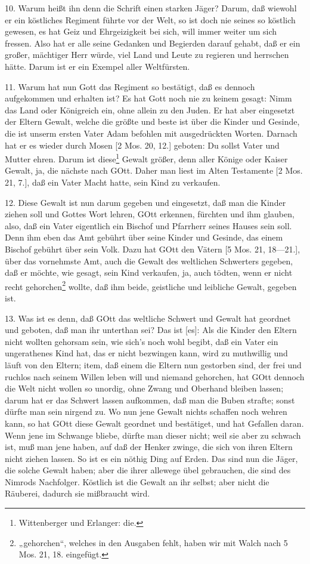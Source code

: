 10. Warum heißt ihn denn die Schrift einen starken Jäger? Darum, daß wiewohl er ein köstliches Regiment führte vor der Welt, so ist doch nie seines so köstlich gewesen, es hat Geiz und Ehrgeizigkeit bei sich, will immer weiter um sich fressen. Also hat er alle seine Gedanken und Begierden darauf gehabt, daß er ein großer, mächtiger Herr würde, viel Land und Leute zu regieren und herrschen hätte. Darum ist er ein Exempel aller Weltfürsten.

11. Warum hat nun Gott das Regiment so bestätigt, daß es dennoch aufgekommen und erhalten ist? Es hat Gott noch nie zu keinem gesagt: Nimm das Land oder Königreich ein, ohne allein zu den Juden. Er hat aber eingesetzt der Eltern Gewalt, welche die größte und beste ist über die Kinder und Gesinde, die ist unserm ersten Vater Adam befohlen mit ausgedrückten Worten. Darnach hat er es wieder durch Mosen
[2 Mos. 20, 12.] geboten: Du sollst Vater und Mutter ehren. Darum ist diese\footnote{Wittenberger und Erlanger: die.} Gewalt größer, denn aller Könige oder Kaiser Gewalt, ja, die nächste nach GOtt. Daher man liest im Alten Testamente [2 Mos. 21, 7.], daß ein Vater Macht hatte, sein Kind zu verkaufen.

12. Diese Gewalt ist nun darum gegeben und eingesetzt, daß man die Kinder ziehen soll und Gottes Wort lehren, GOtt erkennen, fürchten und ihm glauben, also, daß ein Vater eigentlich ein Bischof und Pfarrherr seines Hauses sein soll. Denn ihm eben das Amt gebührt über seine Kinder und Gesinde, das einem Bischof gebührt über sein Volk. Dazu hat GOtt den Vätern [5 Mos. 21, 18—21.], über das vornehmste Amt, auch die Gewalt des weltlichen Schwerters gegeben, daß er möchte, wie gesagt, sein Kind verkaufen, ja, auch tödten, wenn er nicht recht gehorchen\footnote{„gehorchen“, welches in den Ausgaben fehlt, haben wir mit Walch nach 5 Mos. 21, 18. eingefügt.} wollte, daß ihm beide, geistliche und leibliche Gewalt, gegeben ist.

13. Was ist es denn, daß GOtt das weltliche Schwert und Gewalt hat geordnet und geboten, daß man ihr unterthan sei? Das ist [es]: Als die Kinder den Eltern nicht wollten gehorsam sein, wie sich’s noch wohl begibt, daß ein Vater ein ungerathenes Kind hat, das er nicht bezwingen kann, wird zu muthwillig und läuft von den Eltern; item, daß einem die Eltern nun gestorben sind, der frei und ruchlos nach seinem Willen leben will und niemand gehorchen, hat GOtt dennoch die Welt nicht wollen so unordig, ohne Zwang und Oberhand bleiben lassen; darum hat er das Schwert lassen aufkommen, daß man die Buben strafte; sonst dürfte man sein nirgend zu. Wo nun jene Gewalt nichts schaffen noch wehren kann, so hat GOtt diese Gewalt geordnet und bestätiget, und hat Gefallen daran. Wenn jene im Schwange bliebe, dürfte man dieser nicht; weil sie aber zu schwach ist, muß man jene haben, auf daß der Henker zwinge, die sich von ihren Eltern nicht ziehen lassen. So ist es ein nöthig Ding auf Erden. Das sind nun die Jäger, die solche Gewalt haben; aber die ihrer allewege übel gebrauchen, die sind des Nimrods Nachfolger. Köstlich ist die Gewalt an ihr selbst; aber nicht die Räuberei, dadurch sie mißbraucht wird.

